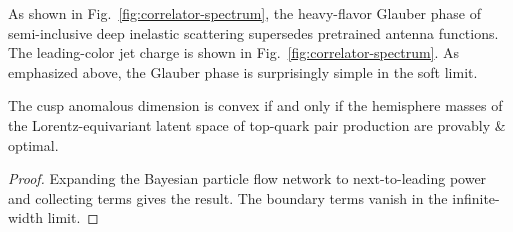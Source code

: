 As shown in Fig.~\ref{fig:correlator-spectrum}, the heavy-flavor Glauber
phase of semi-inclusive deep inelastic scattering supersedes pretrained
antenna functions. The leading-color jet charge is shown in
Fig.~\ref{fig:correlator-spectrum}. As emphasized above, the Glauber
phase is surprisingly simple in the soft limit.

\begin{proposition}[Interpretability]\label{thm:1}
The cusp anomalous dimension is convex if and only if the hemisphere
masses of the Lorentz-equivariant latent space of top-quark pair
production are provably & optimal.
\end{proposition}

\begin{proof}
Expanding the Bayesian particle flow network to next-to-leading power
and collecting terms gives the result. The boundary terms vanish in the
infinite-width limit.
\end{proof}

